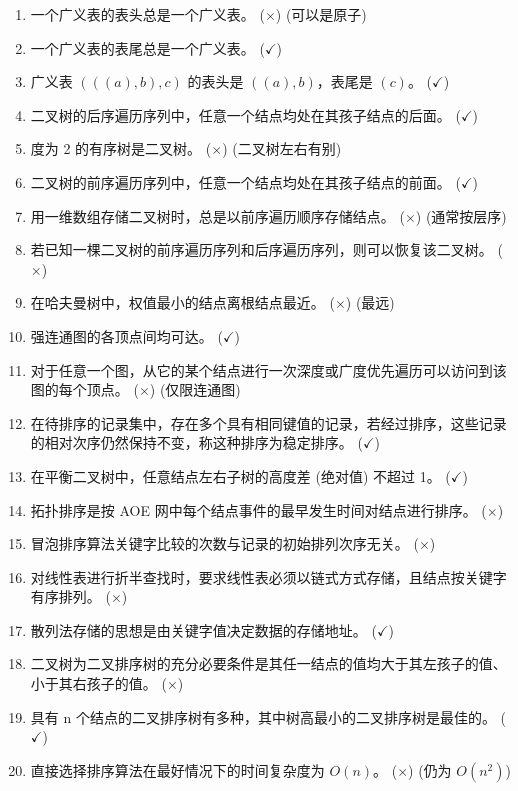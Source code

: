 \documentclass[12pt, a4paper]{article}
\begin{document}
\begin{enumerate}
    \item 一个广义表的表头总是一个广义表。 (\textbf{$\times$}) (可以是原子)
    \item 一个广义表的表尾总是一个广义表。 (\textbf{$\checkmark$})
    \item 广义表 $(((a), b), c)$ 的表头是 $((a), b)$，表尾是 $(c)$。 (\textbf{$\checkmark$})
    \item 二叉树的后序遍历序列中，任意一个结点均处在其孩子结点的后面。 (\textbf{$\checkmark$})
    \item 度为 2 的有序树是二叉树。 (\textbf{$\times$}) (二叉树左右有别)
    \item 二叉树的前序遍历序列中，任意一个结点均处在其孩子结点的前面。 (\textbf{$\checkmark$})
    \item 用一维数组存储二叉树时，总是以前序遍历顺序存储结点。 (\textbf{$\times$}) (通常按层序)
    \item 若已知一棵二叉树的前序遍历序列和后序遍历序列，则可以恢复该二叉树。 (\textbf{$\times$})
    \item 在哈夫曼树中，权值最小的结点离根结点最近。 (\textbf{$\times$}) (最远)
    \item 强连通图的各顶点间均可达。 (\textbf{$\checkmark$})
    \item 对于任意一个图，从它的某个结点进行一次深度或广度优先遍历可以访问到该图的每个顶点。 (\textbf{$\times$}) (仅限连通图)
    \item 在待排序的记录集中，存在多个具有相同键值的记录，若经过排序，这些记录的相对次序仍然保持不变，称这种排序为稳定排序。 (\textbf{$\checkmark$})
    \item 在平衡二叉树中，任意结点左右子树的高度差 (绝对值) 不超过 1。 (\textbf{$\checkmark$})
    \item 拓扑排序是按 AOE 网中每个结点事件的最早发生时间对结点进行排序。 (\textbf{$\times$})
    \item 冒泡排序算法关键字比较的次数与记录的初始排列次序无关。 (\textbf{$\times$})
    \item 对线性表进行折半查找时，要求线性表必须以链式方式存储，且结点按关键字有序排列。 (\textbf{$\times$})
    \item 散列法存储的思想是由关键字值决定数据的存储地址。 (\textbf{$\checkmark$})
    \item 二叉树为二叉排序树的充分必要条件是其任一结点的值均大于其左孩子的值、小于其右孩子的值。 (\textbf{$\times$})
    \item 具有 n 个结点的二叉排序树有多种，其中树高最小的二叉排序树是最佳的。 (\textbf{$\checkmark$})
    \item 直接选择排序算法在最好情况下的时间复杂度为 $O(n)$。 (\textbf{$\times$}) (仍为 $O(n^2)$)
\end{enumerate}
\end{document}
